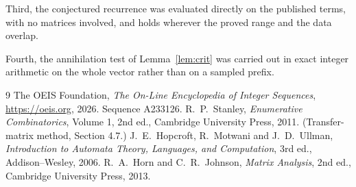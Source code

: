 \documentclass[11pt,a4paper]{article}
\theoremstyle{plain}
\theoremstyle{definition}
\begin{document}
Third, the conjectured recurrence was evaluated directly on the published terms, with no
matrices involved, and holds wherever the proved range and the data overlap.

Fourth, the annihilation test of Lemma~\ref{lem:crit} was carried out in exact integer
arithmetic on the whole vector rather than on a sampled prefix.

\begin{thebibliography}{9}
 The OEIS Foundation, \emph{The On-Line Encyclopedia of Integer
Sequences}, \url{https://oeis.org}, 2026. Sequence A233126.
 R.~P.~Stanley, \emph{Enumerative Combinatorics}, Volume 1, 2nd ed.,
Cambridge University Press, 2011. (Transfer-matrix method, Section 4.7.)
 J.~E.~Hopcroft, R.~Motwani and J.~D.~Ullman, \emph{Introduction to Automata
Theory, Languages, and Computation}, 3rd ed., Addison--Wesley, 2006.
 R.~A.~Horn and C.~R.~Johnson, \emph{Matrix Analysis}, 2nd ed., Cambridge
University Press, 2013.
\end{thebibliography}
\end{document}
